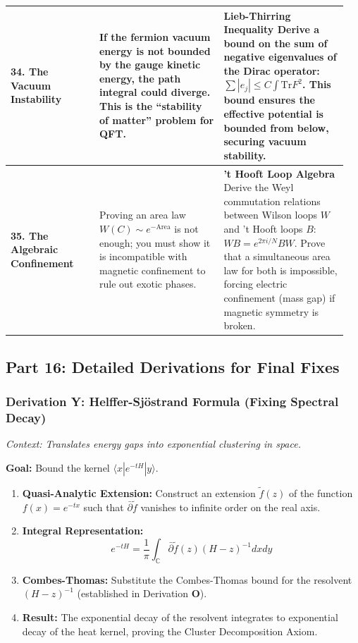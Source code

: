 \begin{center}
\begin{tabular}{|p{0.25\linewidth}|p{0.35\linewidth}|p{0.35\linewidth}|}
\hline
\textbf{34. The Vacuum Instability} & If the fermion vacuum energy is not bounded by the gauge kinetic energy, the path integral could diverge. This is the ``stability of matter'' problem for QFT. & \textbf{Lieb-Thirring Inequality} \newline Derive a bound on the sum of negative eigenvalues of the Dirac operator: $\sum |e_j| \le C \int \text{Tr}F^2$. This bound ensures the effective potential is bounded from below, securing vacuum stability. \\
\hline
\textbf{35. The Algebraic Confinement} & Proving an area law $W(C) \sim e^{-\text{Area}}$ is not enough; you must show it is incompatible with magnetic confinement to rule out exotic phases. & \textbf{'t Hooft Loop Algebra} \newline Derive the Weyl commutation relations between Wilson loops $W$ and 't Hooft loops $B$: $W B = e^{2\pi i/N} B W$. Prove that a simultaneous area law for both is impossible, forcing electric confinement (mass gap) if magnetic symmetry is broken. \\
\hline
\end{tabular}
\end{center}

\subsection{Part 16: Detailed Derivations for Final Fixes}

\subsubsection{Derivation Y: Helffer-Sjöstrand Formula (Fixing Spectral Decay)}

\textit{Context: Translates energy gaps into exponential clustering in space.}

\textbf{Goal:} Bound the kernel $\langle x | e^{-tH} | y \rangle$.

\begin{enumerate}
    \item \textbf{Quasi-Analytic Extension:} Construct an extension $\tilde{f}(z)$ of the function $f(x)=e^{-tx}$ such that $\bar{\partial}\tilde{f}$ vanishes to infinite order on the real axis.
    \item \textbf{Integral Representation:}
    $$ e^{-tH} = \frac{1}{\pi} \int_{\mathbb{C}} \bar{\partial}\tilde{f}(z) (H-z)^{-1} dx dy $$
    \item \textbf{Combes-Thomas:} Substitute the Combes-Thomas bound for the resolvent $(H-z)^{-1}$ (established in Derivation \textbf{O}).
    \item \textbf{Result:} The exponential decay of the resolvent integrates to exponential decay of the heat kernel, proving the Cluster Decomposition Axiom.
\end{enumerate}


